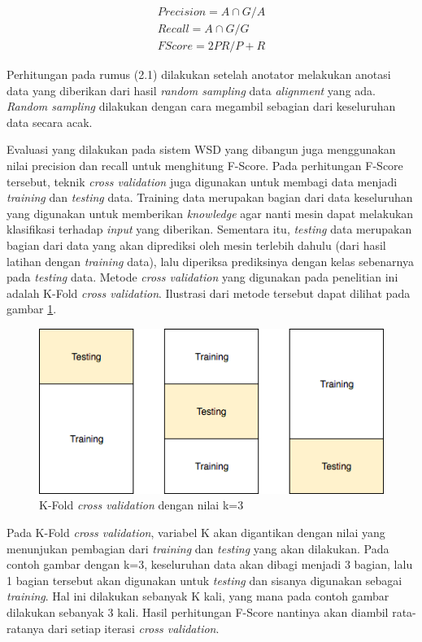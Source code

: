 \begin{equation}
\begin{split}
Precision = A \cap G / A \\
Recall = A \cap G / G \\
FScore = 2 P R / P + R
\end{split}
\end{equation}

Perhitungan pada rumus (2.1) dilakukan setelah anotator melakukan anotasi data yang diberikan dari hasil \textit{random sampling} data \textit{alignment} yang ada. \textit{Random sampling} dilakukan dengan cara megambil sebagian dari keseluruhan data secara acak.

Evaluasi yang dilakukan pada sistem WSD yang dibangun juga menggunakan nilai precision dan recall untuk menghitung F-Score. Pada perhitungan F-Score tersebut, teknik \textit{cross validation} juga digunakan untuk membagi data menjadi \textit{training} dan \textit{testing} data. Training data merupakan bagian dari data keseluruhan yang digunakan untuk memberikan \textit{knowledge} agar nanti mesin dapat melakukan klasifikasi terhadap \textit{input} yang diberikan. Sementara itu, \textit{testing} data merupakan bagian dari data yang akan diprediksi oleh mesin terlebih dahulu (dari hasil latihan dengan \textit{training} data), lalu diperiksa prediksinya dengan kelas sebenarnya pada \textit{testing} data. Metode \textit{cross validation} yang digunakan pada penelitian ini adalah K-Fold \textit{cross validation}. Ilustrasi dari metode tersebut dapat dilihat pada gambar \ref{fig:cross_val}.

\begin{figure}
	\centering
	\includegraphics[width=1\linewidth]{adit_pics/cross_validation}
	\caption{K-Fold \textit{cross validation} dengan nilai k=3}
	\label{fig:cross_val}
\end{figure}

Pada K-Fold \textit{cross validation}, variabel K akan digantikan dengan nilai yang menunjukan pembagian dari \textit{training} dan \textit{testing} yang akan dilakukan. Pada contoh gambar dengan k=3, keseluruhan data akan dibagi menjadi 3 bagian, lalu 1 bagian tersebut akan digunakan untuk \textit{testing} dan sisanya digunakan sebagai \textit{training}. Hal ini dilakukan sebanyak K kali, yang mana pada contoh gambar dilakukan sebanyak 3 kali. Hasil perhitungan F-Score nantinya akan diambil rata-ratanya dari setiap iterasi \textit{cross validation}.